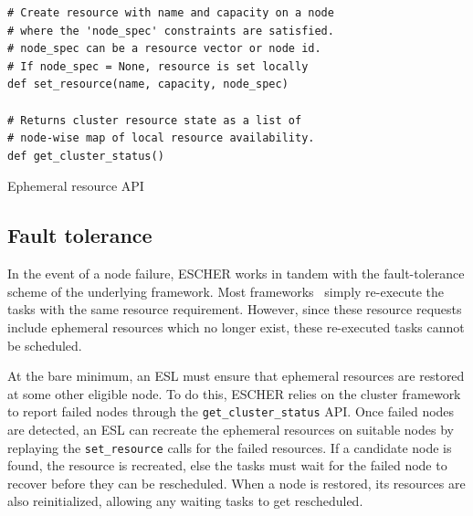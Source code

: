 


\begin{listing}
\begin{verbatim}
# Create resource with name and capacity on a node 
# where the 'node_spec' constraints are satisfied.
# node_spec can be a resource vector or node id.
# If node_spec = None, resource is set locally
def set_resource(name, capacity, node_spec)

# Returns cluster resource state as a list of 
# node-wise map of local resource availability.
def get_cluster_status()
\end{verbatim}
\caption{Ephemeral resource API}
\vspace{-1em}
\label{list:er-api}
\end{listing}

\subsection{Fault tolerance}
\label{sec:esl-faulttol}
In the event of a node failure, ESCHER works in tandem with the fault-tolerance scheme of the underlying framework. Most frameworks~\cite{ray,kubernetes} simply re-execute the tasks with the same resource requirement. However, since these resource requests include ephemeral resources which no longer exist, these re-executed tasks cannot be scheduled.

At the bare minimum, an ESL must ensure that ephemeral resources are restored at some other eligible node. To do this, ESCHER relies on the cluster framework to report failed nodes through the \lstinline{get_cluster_status} API. Once failed nodes are detected, an ESL can recreate the ephemeral resources on suitable nodes by replaying the \lstinline{set_resource} calls for the failed resources. If a candidate node is found, the resource is recreated, else the tasks must wait for the failed node to recover before they can be rescheduled. When a node is restored, its resources are also reinitialized, allowing any waiting tasks to get rescheduled. %

